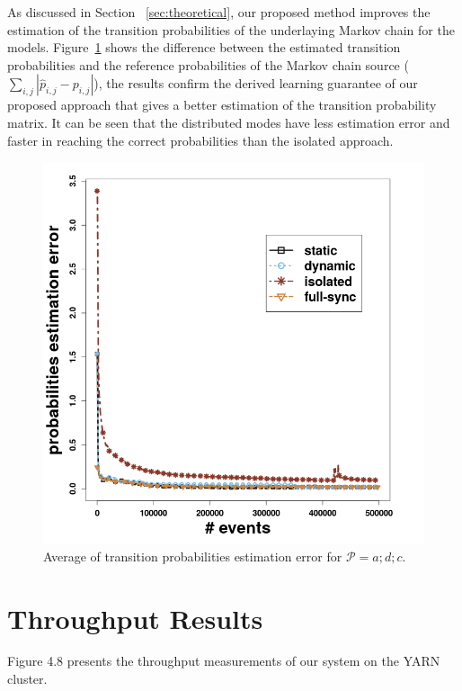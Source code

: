As discussed in Section ~\ref{sec:theoretical}, our proposed method improves the estimation of the transition probabilities of the underlaying Markov chain for the \pmcmr models. Figure~\ref{fig:error_synthetic} shows the difference between the estimated transition probabilities and the reference probabilities of the Markov chain source ($\sum_{i,j} |\hat{p}_{i,j} - {p}_{i,j}|$), the results confirm the derived learning guarantee of our proposed approach that gives a better estimation of the transition probability matrix. It can be seen that the distributed modes have less estimation error and faster in reaching the correct probabilities than the isolated approach.  
\begin{figure}[H]
	\centering
	\includegraphics[width=\textwidth,height=.62\textheight]{chapters/figures/synthetic/error_synthetic_15_0001.png}
	
	\caption{Average of transition probabilities estimation error for $\mathcal{P}=a;d;c$.}
	\label{fig:error_synthetic}
\end{figure}




\section{Throughput Results}
\label{sec:throughput}
Figure 4.8 presents the throughput measurements of our system on the YARN cluster.  

